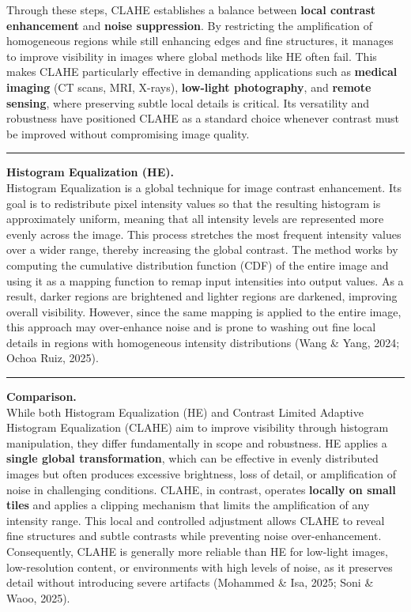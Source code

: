 \documentclass[11pt]{article}
\begin{document}
Through these steps, CLAHE establishes a balance between \textbf{local
contrast enhancement} and \textbf{noise suppression}. By restricting the
amplification of homogeneous regions while still enhancing edges and
fine structures, it manages to improve visibility in images where global
methods like HE often fail. This makes CLAHE particularly effective in
demanding applications such as \textbf{medical imaging} (CT scans, MRI,
X-rays), \textbf{low-light photography}, and \textbf{remote sensing},
where preserving subtle local details is critical. Its versatility and
robustness have positioned CLAHE as a standard choice whenever contrast
must be improved without compromising image quality.

\begin{center}\rule{0.5\linewidth}{0.5pt}\end{center}

    \textbf{Histogram Equalization (HE).}\\
Histogram Equalization is a global technique for image contrast
enhancement. Its goal is to redistribute pixel intensity values so that
the resulting histogram is approximately uniform, meaning that all
intensity levels are represented more evenly across the image. This
process stretches the most frequent intensity values over a wider range,
thereby increasing the global contrast. The method works by computing
the cumulative distribution function (CDF) of the entire image and using
it as a mapping function to remap input intensities into output values.
As a result, darker regions are brightened and lighter regions are
darkened, improving overall visibility. However, since the same mapping
is applied to the entire image, this approach may over-enhance noise and
is prone to washing out fine local details in regions with homogeneous
intensity distributions (Wang \& Yang, 2024; Ochoa Ruiz, 2025).

\begin{center}\rule{0.5\linewidth}{0.5pt}\end{center}

\textbf{Comparison.}\\
While both Histogram Equalization (HE) and Contrast Limited Adaptive
Histogram Equalization (CLAHE) aim to improve visibility through
histogram manipulation, they differ fundamentally in scope and
robustness. HE applies a \textbf{single global transformation}, which
can be effective in evenly distributed images but often produces
excessive brightness, loss of detail, or amplification of noise in
challenging conditions. CLAHE, in contrast, operates \textbf{locally on
small tiles} and applies a clipping mechanism that limits the
amplification of any intensity range. This local and controlled
adjustment allows CLAHE to reveal fine structures and subtle contrasts
while preventing noise over-enhancement. Consequently, CLAHE is
generally more reliable than HE for low-light images, low-resolution
content, or environments with high levels of noise, as it preserves
detail without introducing severe artifacts (Mohammed \& Isa, 2025; Soni
\& Waoo, 2025).
\end{document}
